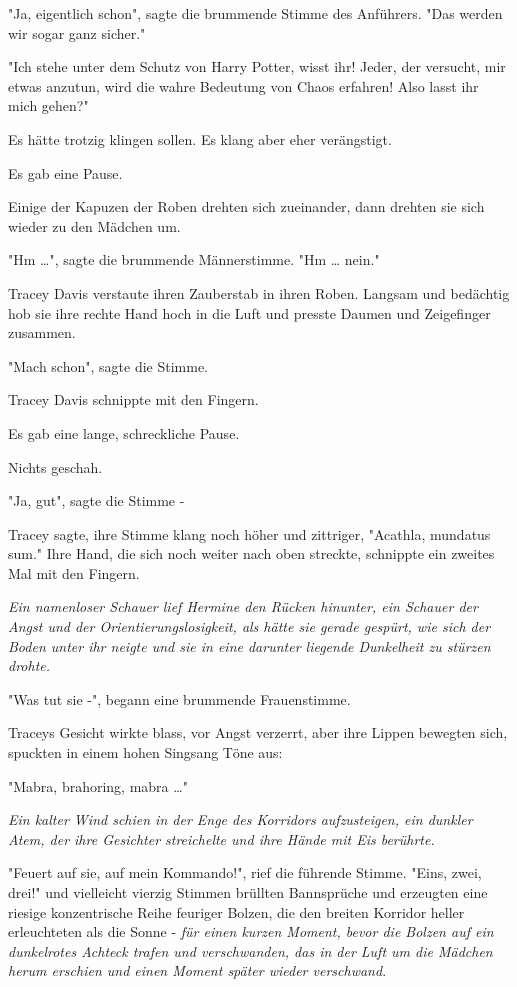 {"Ja, eigentlich schon", sagte die brummende Stimme des Anführers. "Das werden wir sogar ganz sicher."

"Ich stehe unter dem Schutz von Harry Potter, wisst ihr! Jeder, der versucht, mir etwas anzutun, wird die wahre Bedeutung von Chaos erfahren! Also lasst ihr mich gehen?"

Es hätte trotzig klingen sollen. Es klang aber eher verängstigt.

Es gab eine Pause.

Einige der Kapuzen der Roben drehten sich zueinander, dann drehten sie sich wieder zu den Mädchen um.

"Hm …", sagte die brummende Männerstimme. "Hm … nein."

Tracey Davis verstaute ihren Zauberstab in ihren Roben. Langsam und bedächtig hob sie ihre rechte Hand hoch in die Luft und presste Daumen und Zeigefinger zusammen.

"Mach schon", sagte die Stimme.

Tracey Davis schnippte mit den Fingern.

Es gab eine lange, schreckliche Pause.

Nichts geschah.

"Ja, gut", sagte die Stimme -

Tracey sagte, ihre Stimme klang noch höher und zittriger, "Acathla, mundatus sum." Ihre Hand, die sich noch weiter nach oben streckte, schnippte ein zweites Mal mit den Fingern.

\emph{Ein namenloser Schauer lief Hermine den Rücken hinunter, ein Schauer der Angst und der Orientierungslosigkeit, als hätte sie gerade gespürt, wie sich der Boden unter ihr neigte und sie in eine darunter liegende Dunkelheit zu stürzen drohte.}

"Was tut sie -", begann eine brummende Frauenstimme.

Traceys Gesicht wirkte blass, vor Angst verzerrt, aber ihre Lippen bewegten sich, spuckten in einem hohen Singsang Töne aus:

"Mabra, brahoring, mabra …"

\emph{Ein kalter Wind schien in der Enge des Korridors aufzusteigen, ein dunkler Atem, der ihre Gesichter streichelte und ihre Hände mit Eis berührte.}

"Feuert auf sie, auf mein Kommando!", rief die führende Stimme. "Eins, zwei, drei!" und vielleicht vierzig Stimmen brüllten Bannsprüche und erzeugten eine riesige konzentrische Reihe feuriger Bolzen, die den breiten Korridor heller erleuchteten als die Sonne - \emph{für einen kurzen Moment, bevor die Bolzen auf ein dunkelrotes Achteck trafen und verschwanden, das in der Luft um die Mädchen herum erschien und einen Moment später wieder verschwand}.

}
